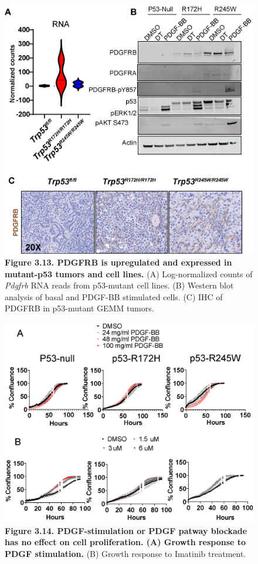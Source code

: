 \begin{figure}
\hypertarget{fig:3.13}{%
\centering
\includegraphics[width=1\textwidth,height=\textheight]{images/pdgfr_1.png}
\caption{\textbf{Figure 3.13. PDGFRB is upregulated and expressed in mutant-p53 tumors and cell lines.} (A) Log-normalized counts of \emph{Pdgfrb} RNA reads from p53-mutant cell lines. (B) Western blot analysis of basal and PDGF-BB stimulated cells. (C) IHC of PDGFRB in p53-mutant GEMM tumors.}\label{fig:3.13}
}
\end{figure}

\begin{figure}
\hypertarget{fig:3.14}{%
\centering
\includegraphics[width=1\textwidth,height=\textheight]{images/pdgfr_2.png}
\caption{\textbf{Figure 3.14. PDGF-stimulation or PDGF patway blockade has no effect on cell proliferation. (A) Growth response to PDGF stimulation.} (B) Growth response to Imatinib treatment.}\label{fig:3.14}
}
\end{figure}

